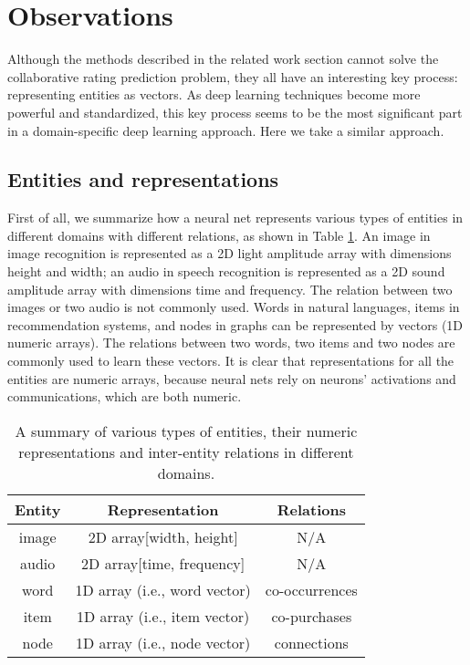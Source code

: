 \documentclass[sigconf]{acmart}
\begin{document}
\section{Observations}
Although the methods described in the related work section cannot solve the 
collaborative rating prediction problem,
they all have an interesting key process: representing entities as vectors.
As deep learning techniques become more powerful and standardized, this key 
process seems to be the most significant part in a domain-specific deep 
learning approach.
Here we take a similar approach.

\subsection{Entities and representations}
First of all, we summarize how a neural net represents various types of 
entities in different domains with different relations, as shown in 
Table \ref{tab:domains}.
An image in image recognition is represented as a 2D light amplitude 
array with dimensions height and width; an audio in speech recognition 
is represented as a 2D sound amplitude array with dimensions time and 
frequency.
The relation between two images or two audio is not commonly used. 
Words in natural languages, items in recommendation systems, and nodes 
in graphs can be represented by vectors (1D numeric arrays).
The	relations between two words, two items and two nodes are commonly 
used to learn these vectors.
It is clear that representations for all the entities are numeric arrays, 
because neural nets rely on neurons' activations and communications, which 
are both numeric.
\begin{table}[!htb]
	\centering
	\caption{A summary of various types of entities, their numeric
		representations and inter-entity relations in different domains.
	}
	\begin{tabular}{ccc} \hline
		Entity & Representation               & Relations \\ \hline
		image  & 2D array[width, height]      & N/A \\ \hline
		audio  & 2D array[time, frequency]    & N/A \\ \hline
		word   & 1D array (i.e., word vector) & co-occurrences \\ \hline
		item   & 1D array (i.e., item vector) & co-purchases \\ \hline
		node   & 1D array (i.e., node vector) & connections \\ \hline
	\end{tabular}
	\label{tab:domains}
\end{table}
\end{document}
